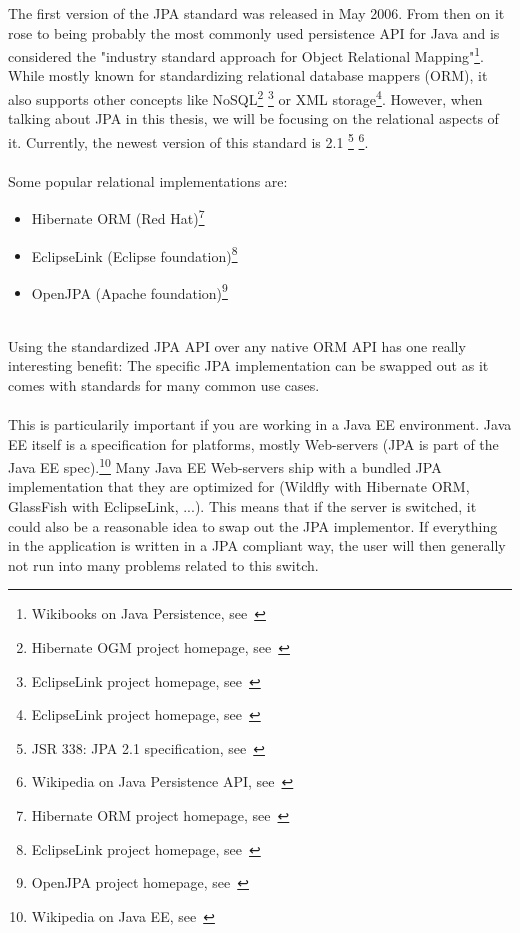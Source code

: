 The first version of the JPA standard was released in May 2006. From then on it rose to being probably the most commonly used persistence API for Java and is considered the "industry standard approach for Object Relational Mapping"\footnote{Wikibooks on Java Persistence, see~\cite{wikibooks_on_jpa}}. While mostly known for standardizing relational database mappers (ORM), it also supports other concepts like NoSQL\footnote{Hibernate OGM project homepage, see~\cite{hibernate_ogm}} \footnote{EclipseLink project homepage, see~\cite{eclipselink}} or XML storage\footnote{EclipseLink project homepage, see~\cite{eclipselink}}. However, when talking about JPA in this thesis, we will be focusing on the relational aspects of it. Currently, the newest version of this standard is 2.1 \footnote{JSR 338: JPA 2.1 specification, see~\cite{jpa_21_jcp}} \footnote{Wikipedia on Java Persistence API, see~\cite{wiki_jpa}}.
\\\\
Some popular relational implementations are:
\begin{itemize}
	\item Hibernate ORM (Red Hat)\footnote{Hibernate ORM project homepage, see~\cite{hibernate_orm}}
	\item EclipseLink (Eclipse foundation)\footnote{EclipseLink project homepage, see~\cite{eclipselink}}
	\item OpenJPA (Apache foundation)\footnote{OpenJPA project homepage, see~\cite{openjpa}}
\end{itemize}
~\\
Using the standardized JPA API over any native ORM API has one really interesting benefit:
The specific JPA implementation can be swapped out as it comes with standards for many common use cases.
\\\\
This is particularily important if you are working in a Java EE environment. Java EE itself is a specification for platforms, mostly Web-servers (JPA is part of the Java EE spec).\footnote{Wikipedia on Java EE, see~\cite{wiki_java_ee}} Many Java EE Web-servers ship with a bundled JPA implementation that they are optimized for (Wildfly with Hibernate ORM, GlassFish with EclipseLink, ...). This means that if the server is switched, it could also be a reasonable idea to swap out the JPA implementor. If everything in the application is written in a JPA compliant way, the user will then generally not run into many problems related to this switch.

\pagebreak

